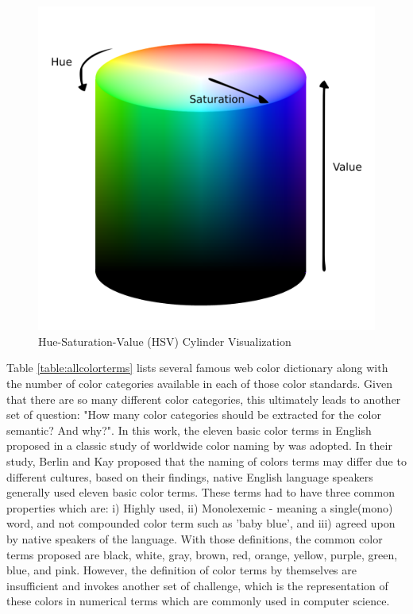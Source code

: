 \begin{figure}[hbt!]\centering
\includegraphics[width=.5\textwidth]{image/general/HSV.png}
\caption{Hue-Saturation-Value (HSV) Cylinder Visualization}
\label{fig:hsvcylinder}
\end{figure}




Table \ref{table:allcolorterms} lists several famous web color dictionary along with the number of color categories available in each of those color standards. Given that there are so many different color categories, this ultimately leads to another set of question: "How many color categories should be extracted for the color semantic? And why?". In this work, the eleven basic color terms in English proposed in a classic study of worldwide color naming by \cite{berlinandkay} was adopted. In their study, Berlin and Kay proposed that the naming of colors terms may differ due to different cultures, based on their findings, native English language speakers generally used eleven basic color terms. These terms had to have three common properties which are: i) Highly used, ii) Monolexemic - meaning a single(mono) word, and not compounded color term such as 'baby blue', and iii) agreed upon by native speakers of the language. With those definitions, the common color terms proposed are black, white, gray, brown, red, orange, yellow, purple, green, blue, and pink. However, the definition of color terms by themselves are insufficient and invokes another set of challenge, which is the representation of these colors in numerical terms which are commonly used in computer science. 

